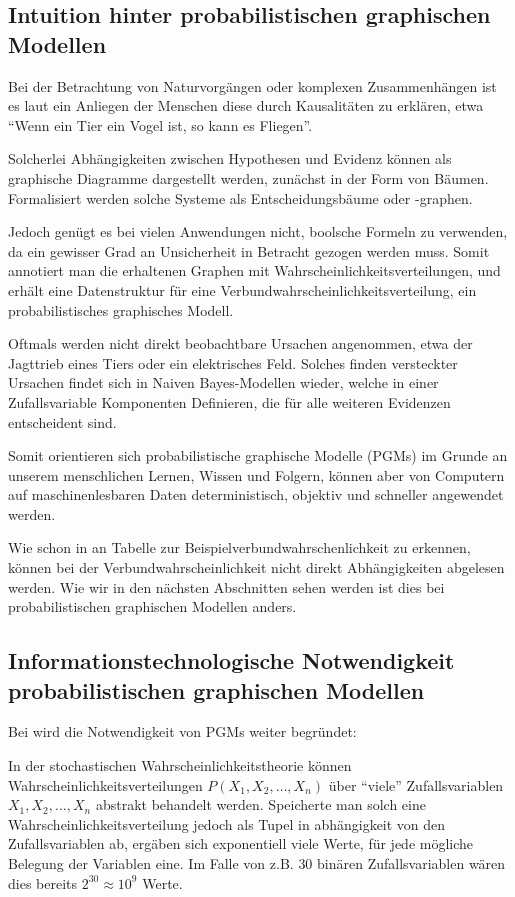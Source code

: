 \documentclass{llncs}
\begin{document}
\subsection{Intuition hinter probabilistischen graphischen Modellen}

Bei der Betrachtung von Naturvorgängen oder komplexen Zusammenhängen ist es laut \cite{pearl1988probabilistic} ein Anliegen der Menschen diese durch Kausalitäten zu erklären, etwa ``Wenn ein Tier ein Vogel ist, so kann es Fliegen''. 

Solcherlei Abhängigkeiten zwischen Hypothesen und Evidenz können als graphische Diagramme dargestellt werden, zunächst in der Form von Bäumen. Formalisiert werden solche Systeme als Entscheidungsbäume oder -graphen. 

Jedoch genügt es bei vielen Anwendungen nicht, boolsche Formeln zu verwenden, da ein gewisser Grad an Unsicherheit in Betracht gezogen werden muss. Somit annotiert man die erhaltenen Graphen mit  Wahrscheinlichkeitsverteilungen, und erhält eine Datenstruktur für eine Verbundwahrscheinlichkeitsverteilung, ein probabilistisches graphisches Modell. 

Oftmals werden nicht direkt beobachtbare Ursachen angenommen, etwa der Jagttrieb eines Tiers oder ein elektrisches Feld. Solches finden versteckter Ursachen findet sich in Naiven Bayes-Modellen wieder, welche in einer Zufallsvariable Komponenten Definieren, die für alle weiteren Evidenzen entscheident sind. 

Somit orientieren sich probabilistische graphische Modelle (PGMs) im Grunde an unserem menschlichen Lernen, Wissen und Folgern, können aber von Computern auf maschinenlesbaren Daten deterministisch, objektiv und schneller angewendet werden.

Wie schon in an Tabelle zur Beispielverbundwahrschenlichkeit zu erkennen, können bei der Verbundwahrscheinlichkeit nicht direkt Abhängigkeiten abgelesen werden. Wie wir in den nächsten Abschnitten sehen werden ist dies bei probabilistischen graphischen Modellen anders. 

\subsection{Informationstechnologische Notwendigkeit probabilistischen graphischen Modellen}

Bei \cite{koller2009probabilistic} wird die Notwendigkeit von PGMs weiter begründet: 

In der stochastischen Wahrscheinlichkeitstheorie können Wahrscheinlichkeitsverteilungen $P(X_1,X_2,\dots,X_n)$ über ``viele'' Zufallsvariablen $X_1,X_2,\dots,X_n$ abstrakt behandelt werden. Speicherte man solch eine Wahrscheinlichkeitsverteilung jedoch als Tupel in abhängigkeit von den Zufallsvariablen ab, ergäben sich exponentiell viele Werte, für jede mögliche Belegung der Variablen eine. Im Falle von z.B. $30$ binären Zufallsvariablen wären dies bereits $2^{30} \approx 10^9 $ Werte. 
\end{document}
